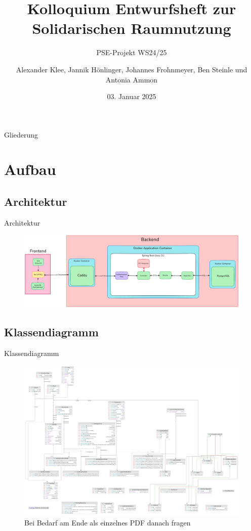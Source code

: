 \documentclass{sdqbeamer}
\title[Solidarische Raumnutzung Entwurfsheft]{Kolloquium Entwurfsheft zur Solidarischen Raumnutzung}
\author[Soli-Gruppe]{Alexander Klee, Jannik Hönlinger, Johannes Frohnmeyer, Ben Steinle und Antonia Ammon }
\subtitle{PSE-Projekt WS24/25}
\date[03.\,01.\,2025]{03. Januar 2025}
\begin{document}
 
\KITtitleframe

\begin{frame}{Gliederung}
\tableofcontents
\end{frame}

\section{Aufbau}

\subsection{Architektur}
\begin{frame}{Architektur}
\begin{figure}
    \centering
    \includegraphics[width=\textwidth]{pictures/figures/architecture}
    \label{fig:architektur}
\end{figure}
\end{frame}

\subsection{Klassendiagramm}
\begin{frame}{Klassendiagramm}
    \begin{figure}
        \centering
        \includegraphics[width=\textwidth]{pictures/figures/classes}
        \caption{Bei Bedarf am Ende als einzelnes PDF danach fragen}
        \label{fig:klassendiagramm}
    \end{figure}
\end{frame}
\end{document}
